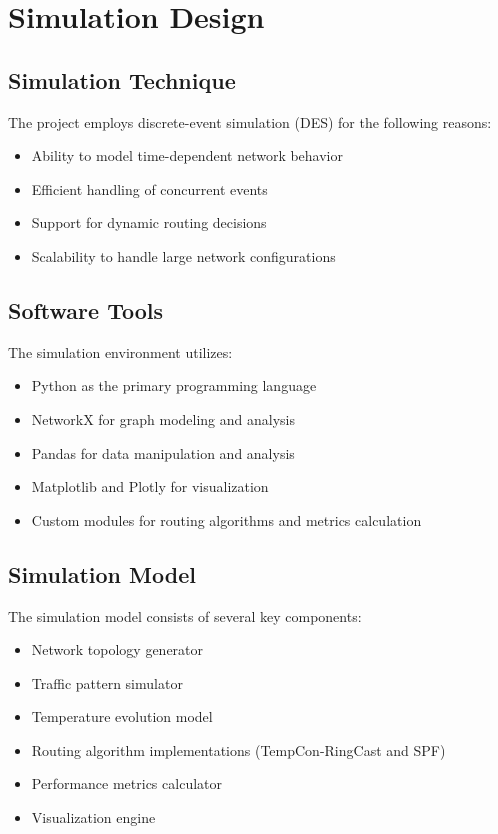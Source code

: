 \documentclass[12pt]{article}
\begin{document}
\section{Simulation Design}
\subsection{Simulation Technique}
The project employs discrete-event simulation (DES) for the following reasons:
\begin{itemize}
    \item Ability to model time-dependent network behavior
    \item Efficient handling of concurrent events
    \item Support for dynamic routing decisions
    \item Scalability to handle large network configurations
\end{itemize}

\subsection{Software Tools}
The simulation environment utilizes:
\begin{itemize}
    \item Python as the primary programming language
    \item NetworkX for graph modeling and analysis
    \item Pandas for data manipulation and analysis
    \item Matplotlib and Plotly for visualization
    \item Custom modules for routing algorithms and metrics calculation
\end{itemize}

\subsection{Simulation Model}
The simulation model consists of several key components:
\begin{itemize}
    \item Network topology generator
    \item Traffic pattern simulator
    \item Temperature evolution model
    \item Routing algorithm implementations (TempCon-RingCast and SPF)
    \item Performance metrics calculator
    \item Visualization engine
\end{itemize}
\end{document}
